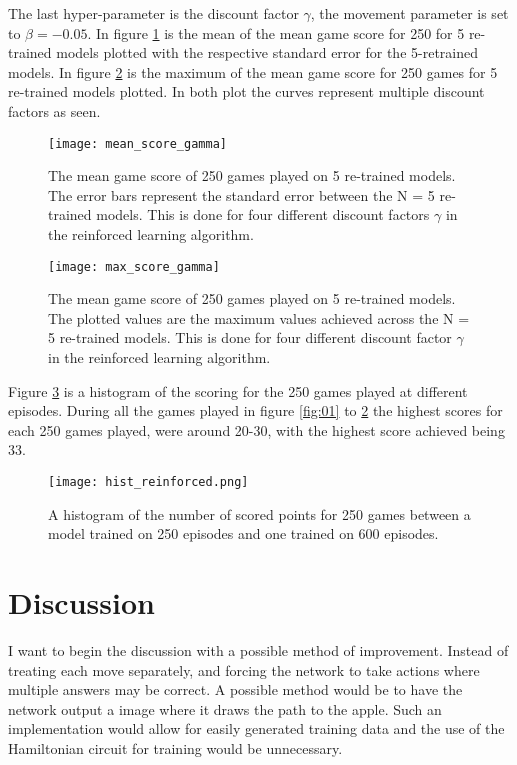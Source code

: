 \documentclass[%
 uio,
 jmp,
 amsmath,amssymb,
 reprint, nofootinbib]{revtex4-1}
\numberwithin{equation}{section}
\begin{document}
The last hyper-parameter is the discount factor \(\gamma\), the movement parameter is set to \(\beta = -0.05\). In figure \ref{fig:11} is the mean of the mean game score for 250 for 5 re-trained models plotted with the respective standard error for the 5-retrained models. In figure \ref{fig:12} is the maximum of the mean game score for 250 games for 5 re-trained models plotted. In both plot the curves represent multiple discount factors as seen.

\begin{figure}[H]
    \centering
    \texttt{[image: mean\_score\_gamma]}
    \caption{The mean game score of 250 games played on 5 re-trained models. The error bars represent the standard error between the N = 5 re-trained models. This is done for four different discount factors \(\gamma\) in the reinforced learning algorithm.}
    \label{fig:11}
\end{figure}

\begin{figure}[H]
    \centering
    \texttt{[image: max\_score\_gamma]}
    \caption{The mean game score of 250 games played on 5 re-trained models. The plotted values are the maximum values achieved across the N = 5 re-trained models. This is done for four different discount factor \(\gamma\) in the reinforced learning algorithm.}
    \label{fig:12}
\end{figure}

Figure \ref{fig:13} is a histogram of the scoring for the 250 games played at different episodes. During all the games played in figure \ref{fig:01} to \ref{fig:12} the highest scores for each 250 games played, were around 20-30, with the highest score achieved being 33.

\begin{figure}[H]
    \centering
    \texttt{[image: hist\_reinforced.png]}
    \caption{A histogram of the number of scored points for 250 games between a model trained on 250 episodes and one trained on 600 episodes.}
    \label{fig:13}
\end{figure}



\section{Discussion}\label{sec:Discussion}

I want to begin the discussion with a possible method of improvement. Instead of treating each move separately, and forcing the network to take actions where multiple answers may be correct. A possible method would be to have the network output a image where it draws the path to the apple. Such an implementation would allow for easily generated training data and the use of the Hamiltonian circuit for training would be unnecessary.
\end{document}
